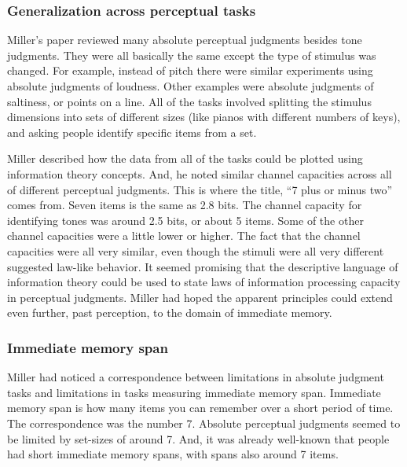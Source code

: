 \documentclass[
  oneside,
  12pt]{crumpbook}
\begin{document}
\hypertarget{generalization-across-perceptual-tasks}{%
\subsubsection{Generalization across perceptual tasks}\label{generalization-across-perceptual-tasks}}

Miller's paper reviewed many absolute perceptual judgments besides tone judgments. They were all basically the same except the type of stimulus was changed. For example, instead of pitch there were similar experiments using absolute judgments of loudness. Other examples were absolute judgments of saltiness, or points on a line. All of the tasks involved splitting the stimulus dimensions into sets of different sizes (like pianos with different numbers of keys), and asking people identify specific items from a set.

Miller described how the data from all of the tasks could be plotted using information theory concepts. And, he noted similar channel capacities across all of different perceptual judgments. This is where the title, ``7 plus or minus two'' comes from. Seven items is the same as 2.8 bits. The channel capacity for identifying tones was around 2.5 bits, or about 5 items. Some of the other channel capacities were a little lower or higher. The fact that the channel capacities were all very similar, even though the stimuli were all very different suggested law-like behavior. It seemed promising that the descriptive language of information theory could be used to state laws of information processing capacity in perceptual judgments. Miller had hoped the apparent principles could extend even further, past perception, to the domain of immediate memory.

\hypertarget{immediate-memory-span}{%
\subsubsection{Immediate memory span}\label{immediate-memory-span}}

Miller had noticed a correspondence between limitations in absolute judgment tasks and limitations in tasks measuring immediate memory span. Immediate memory span is how many items you can remember over a short period of time. The correspondence was the number 7. Absolute perceptual judgments seemed to be limited by set-sizes of around 7. And, it was already well-known that people had short immediate memory spans, with spans also around 7 items.
\end{document}
